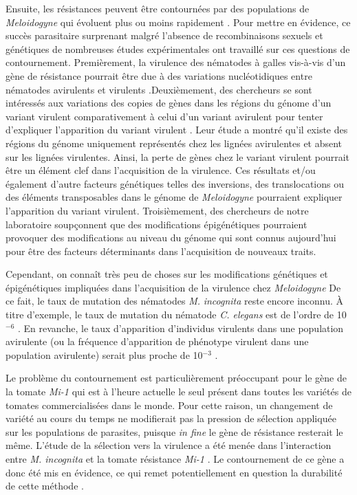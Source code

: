 	
	Ensuite, les résistances peuvent être contournées par des populations  de \textit{Meloidogyne} qui évoluent plus ou moins rapidement \citep{Castagnone-Sereno2002, Verdejo-Lucas2009,Jarquin-Barberena1991}.  
Pour mettre en évidence, ce succès parasitaire surprenant malgré l'absence de recombinaisons sexuels et génétiques de nombreuses études expérimentales  ont travaillé sur ces questions de contournement.
Premièrement, la virulence des nématodes à galles  vis-à-vis d'un gène de résistance pourrait être due  à des  variations nucléotidiques entre
nématodes avirulents et virulents 
\citep{Neveu2003, Semblat2001}.Deuxièmement,
des chercheurs se sont intéressés  aux variations des copies de gènes dans les régions du génome d'un variant virulent comparativement à celui d'un variant avirulent pour tenter d'expliquer l'apparition du variant virulent \citep{Castagnone-sereno2019}. Leur étude a montré qu'il existe des régions du génome uniquement représentés chez les lignées avirulentes et absent sur les lignées virulentes. Ainsi, la perte de gènes chez le variant virulent  pourrait être un élément clef dans l'acquisition de la virulence. Ces résultats et/ou également  d'autre facteurs génétiques telles des  inversions, des translocations ou des éléments transposables  dans le génome de \textit{Meloidogyne}  pourraient expliquer l'apparition du variant virulent. Troisièmement, des chercheurs de notre laboratoire soupçonnent que des modifications épigénétiques  pourraient provoquer des modifications au niveau du génome qui sont connus aujourd'hui pour être des facteurs déterminants dans l'acquisition de nouveaux traits.
	
	 Cependant, on connaît très peu de choses sur les modifications génétiques et épigénétiques impliquées dans l'acquisition de la virulence chez \textit{Meloidogyne} 
De ce fait,  le taux de mutation des nématodes \textit{M.} \textit{incognita} reste encore inconnu. À titre d'exemple, le taux de mutation du nématode \textit{C. elegans}  est  de l'ordre de  10$^{-6}$ \citep{Denver2004}. 
En revanche, le taux d'apparition d'individus virulents dans une population avirulente (ou  la fréquence d'apparition de phénotype virulent dans une population avirulente)  serait plus proche de  10$^{-3}$ \citep{Castagnone-Sereno1994}.
	 
	 Le problème du contournement  est particulièrement préoccupant pour le gène de la tomate \textit{Mi-1} qui est à l'heure actuelle le seul  présent dans toutes les variétés de tomates commercialisées dans le monde. Pour cette raison, un changement de variété au cours du temps ne modifierait pas la pression de sélection appliquée sur les populations de parasites, puisque \textit{in fine} le gène de résistance resterait le même. 
L'étude de la sélection vers  la virulence a été menée dans  l'interaction entre \textit{M. incognita} et la tomate résistance \textit{Mi-1}  \citep{Castagnone-Sereno2002, Castagnone-Sereno2007}. Le contournement de ce gène a donc été mis en évidence, ce qui remet potentiellement en question la durabilité de cette méthode \citep{Castagnone-Sereno2002}.
 
